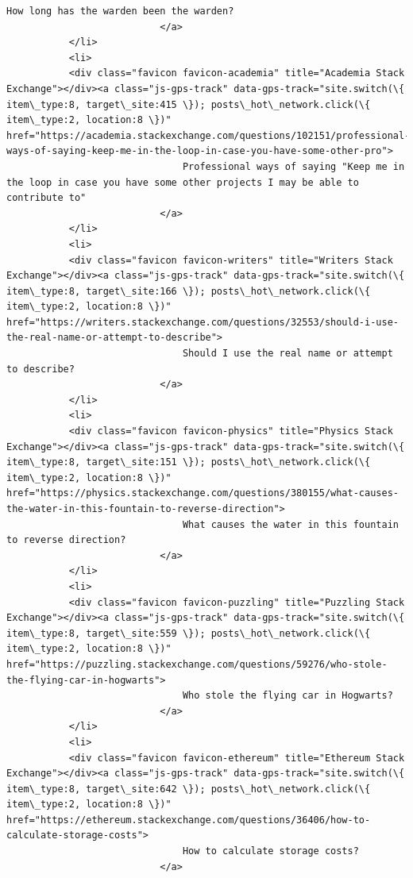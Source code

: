 \documentclass[11pt]{article}
\begin{document}
\begin{Verbatim}[commandchars=\\\{\}]
                               How long has the warden been the warden?
                           </a>
           </li>
           <li>
           <div class="favicon favicon-academia" title="Academia Stack Exchange"></div><a class="js-gps-track" data-gps-track="site.switch(\{ item\_type:8, target\_site:415 \}); posts\_hot\_network.click(\{ item\_type:2, location:8 \})" href="https://academia.stackexchange.com/questions/102151/professional-ways-of-saying-keep-me-in-the-loop-in-case-you-have-some-other-pro">
                               Professional ways of saying "Keep me in the loop in case you have some other projects I may be able to contribute to"
                           </a>
           </li>
           <li>
           <div class="favicon favicon-writers" title="Writers Stack Exchange"></div><a class="js-gps-track" data-gps-track="site.switch(\{ item\_type:8, target\_site:166 \}); posts\_hot\_network.click(\{ item\_type:2, location:8 \})" href="https://writers.stackexchange.com/questions/32553/should-i-use-the-real-name-or-attempt-to-describe">
                               Should I use the real name or attempt to describe?
                           </a>
           </li>
           <li>
           <div class="favicon favicon-physics" title="Physics Stack Exchange"></div><a class="js-gps-track" data-gps-track="site.switch(\{ item\_type:8, target\_site:151 \}); posts\_hot\_network.click(\{ item\_type:2, location:8 \})" href="https://physics.stackexchange.com/questions/380155/what-causes-the-water-in-this-fountain-to-reverse-direction">
                               What causes the water in this fountain to reverse direction?
                           </a>
           </li>
           <li>
           <div class="favicon favicon-puzzling" title="Puzzling Stack Exchange"></div><a class="js-gps-track" data-gps-track="site.switch(\{ item\_type:8, target\_site:559 \}); posts\_hot\_network.click(\{ item\_type:2, location:8 \})" href="https://puzzling.stackexchange.com/questions/59276/who-stole-the-flying-car-in-hogwarts">
                               Who stole the flying car in Hogwarts?
                           </a>
           </li>
           <li>
           <div class="favicon favicon-ethereum" title="Ethereum Stack Exchange"></div><a class="js-gps-track" data-gps-track="site.switch(\{ item\_type:8, target\_site:642 \}); posts\_hot\_network.click(\{ item\_type:2, location:8 \})" href="https://ethereum.stackexchange.com/questions/36406/how-to-calculate-storage-costs">
                               How to calculate storage costs?
                           </a>

\end{Verbatim}
\end{document}
